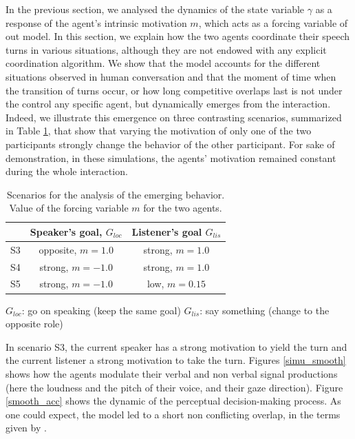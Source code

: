 In the previous section, we analysed the dynamics of the state variable $\gamma$ as a response of the agent's intrinsic motivation $m$, which acts as a forcing variable of out model. In this section, we explain how the two agents coordinate their speech turns in various situations, although they are not endowed with any explicit coordination algorithm. We show that the model accounts for the different situations observed in human conversation and that the moment of time when the transition of turns occur, or how long competitive overlaps last is not under the control any specific agent, but dynamically emerges from the interaction. Indeed, we illustrate this emergence on three contrasting scenarios, summarized in Table \ref{tab_scenarios_emergence}, that show that varying the motivation of only one of the two participants strongly change the behavior of the other participant. For sake of demonstration, in these simulations, the agents' motivation remained constant during the whole interaction. 

\begin{table}
  \begin{center}
    \begin{tabular}{ccc}
      \hline
      \mbox{} & Speaker's goal, $G_{loc}$ & Listener's goal $G_{lis}$\\
      \hline
      S3 & opposite, $m=1.0$ & strong, $m=1.0$\\
      \hline
      S4 & strong, $m=-1.0$ & strong, $m=1.0$\\
      \hline
      S5 & strong, $m=-1.0$ & low, $m=0.15$\\
      \hline
    \end{tabular}
  \end{center}
  $G_{loc}$: go on speaking (keep the same goal)\linebreak
  $G_{lis}$: say something (change to the opposite role)

  \caption{Scenarios for the analysis of the emerging behavior. Value of the forcing variable $m$ for the two agents.}
  \label{tab_scenarios_emergence}
\end{table}

In scenario S3, the current speaker has a strong motivation to yield the turn and the current listener a strong motivation to take the turn. Figures \ref{simu_smooth} shows how the agents modulate their verbal and non verbal signal productions (here the loudness and the pitch of their voice, and their gaze direction). Figure \ref{smooth_acc} shows the dynamic of the perceptual decision-making process. As one could expect, the model led to a short non conflicting overlap, in the terms given by \citep{schegloff_overlapping_2000}. 

